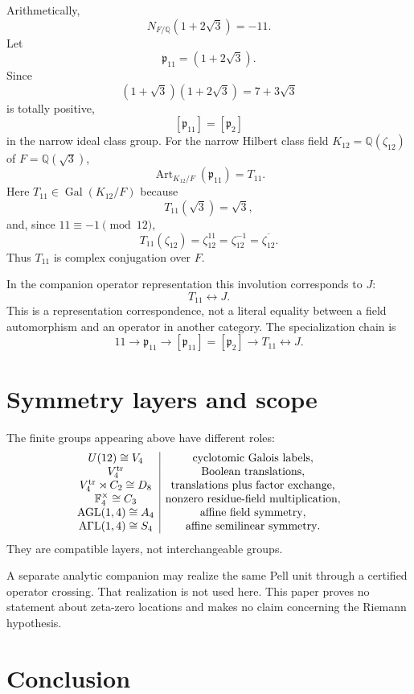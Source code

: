 \documentclass[11pt]{article}
\theoremstyle{remark}
\newcommand{\Q}{\mathbb Q}
\newcommand{\F}{\mathbb F}
\newcommand{\Gal}{\operatorname{Gal}}
\newcommand{\Art}{\operatorname{Art}}
\begin{document}
Arithmetically,
\[
N_{F/\Q}(1+2\sqrt3)=-11.
\]
Let
\[
\mathfrak p_{11}=(1+2\sqrt3).
\]
Since
\[
(1+\sqrt3)(1+2\sqrt3)=7+3\sqrt3
\]
is totally positive,
\[
\boxed{[\mathfrak p_{11}]=[\mathfrak p_2]}
\]
in the narrow ideal class group.  For the narrow Hilbert class field
$K_{12}=\Q(\zeta_{12})$ of $F=\Q(\sqrt3)$,
\[
\boxed{\Art_{K_{12}/F}(\mathfrak p_{11})=T_{11}.}
\]
Here $T_{11}\in\Gal(K_{12}/F)$ because
\[
T_{11}(\sqrt3)=\sqrt3,
\]
and, since $11\equiv-1\pmod{12}$,
\[
T_{11}(\zeta_{12})
=\zeta_{12}^{11}
=\zeta_{12}^{-1}
=\overline{\zeta_{12}}.
\]
Thus $T_{11}$ is complex conjugation over $F$.

In the companion operator representation this involution corresponds to $J$:
\[
\boxed{T_{11}\longleftrightarrow J.}
\]
This is a representation correspondence, not a literal equality between a
field automorphism and an operator in another category.  The specialization
chain is
\[
\boxed{
11\longrightarrow\mathfrak p_{11}
\longrightarrow[\mathfrak p_{11}]=[\mathfrak p_2]
\longrightarrow T_{11}\longleftrightarrow J.}
\]

\section{Symmetry layers and scope}

The finite groups appearing above have different roles:
\[
\begin{array}{c|c}
U(12)\cong V_4 & \text{cyclotomic Galois labels},\\
V_4^{\rm tr} & \text{Boolean translations},\\
V_4^{\rm tr}\rtimes C_2\cong D_8 & \text{translations plus factor exchange},\\
\F_4^\times\cong C_3 & \text{nonzero residue-field multiplication},\\
\operatorname{AGL}(1,4)\cong A_4 & \text{affine field symmetry},\\
\operatorname{A\Gamma L}(1,4)\cong S_4 & \text{affine semilinear symmetry}.
\end{array}
\]
They are compatible layers, not interchangeable groups.

A separate analytic companion may realize the same Pell unit through a
certified operator crossing.  That realization is not used here.  This paper
proves no statement about zeta-zero locations and makes no claim concerning
the Riemann hypothesis.

\section{Conclusion}
\end{document}
